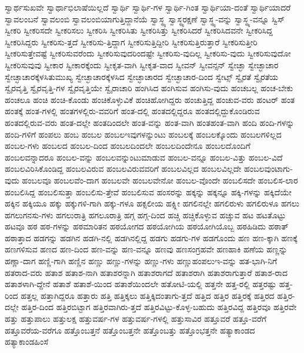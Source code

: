 {ಸ್ವಾರ್ಥಸುಖವೇ
ಸ್ವಾರ್ಥಾಭಿಲಾಷೆಯಿಲ್ಲದೆ
ಸ್ವಾರ್ಥಿ
ಸ್ವಾರ್ಥಿ-ಗಳ
ಸ್ವಾರ್ಥಿ-ಗಿಂತ
ಸ್ವಾರ್ಥಿಯಾ-ದಂತೆ
ಸ್ವಾರ್ಥಿಯಾದರೆ
ಸ್ವಾವಲಂಬನೆ
ಸ್ವಾವಲಂಬಿ
ಸ್ವಾವಲಂಬಿಯಾಗುತ್ತಿದ್ದಾನೆಯೆ
ಸ್ವಾಸ್ಥ್ಯ
ಸ್ವಾಸ್ಥ್ಯರಕ್ಷಣೆ
ಸ್ವಾಸ್ಥ್ಯ-ವನ್ನು
ಸ್ವಾಸ್ಥ್ಯ-ವನ್ನೂ
ಸ್ವಿಸ್
ಸ್ವೀಕರಿ
ಸ್ವೀಕರಿಸದೇ
ಸ್ವೀಕರಿಸಲು
ಸ್ವೀಕರಿಸಿ
ಸ್ವೀಕರಿಸಿತು
ಸ್ವೀಕರಿಸಿತ್ತು
ಸ್ವೀಕರಿಸಿದರೆ
ಸ್ವೀಕರಿಸಿದವನೇ
ಸ್ವೀಕರಿಸಿದ್ದ
ಸ್ವೀಕರಿಸಿದ್ದರು
ಸ್ವೀಕರಿಸು-ತ್ತದೆ
ಸ್ವೀಕರಿಸು-ತ್ತಿದ್ದಾಗ
ಸ್ವೀಕರಿಸುತ್ತಿದ್ದೀರಿ
ಸ್ವೀಕರಿಸುತ್ತಿರುತ್ತಾರೆ
ಸ್ವೀಕರಿಸುತ್ತೀರಿ
ಸ್ವೀಕರಿಸುತ್ತೇವಷ್ಟೆ
ಸ್ವೀಕರಿಸುವರೆಂದು
ಸ್ವೀಕರಿಸುವುದರಿಂದಷ್ಟೇ
ಸ್ವೀಕರಿಸು-ವುದಿಲ್ಲ
ಸ್ವೀಕರಿಸು-ವುದು
ಸ್ವೀಕರಿಸುವುದೋ
ಸ್ವೀಕರಿಸುವುವು
ಸ್ವೀಕಾರ
ಸ್ವೀಕಾರಕ್ಕೆಂದು
ಸ್ವೀಕೃತ-ವಾಗಿ
ಸ್ವೀಕೃತ-ವಾದ
ಸ್ವೀವನ್
ಸ್ವೀವನ್ಸನ್
ಸ್ವೇಚ್ಛಾ
ಸ್ವೇಚ್ಛಾಚಾರ
ಸ್ವೇಚ್ಛಾಚಾರಕ್ಕೆಳಸಿತುಮುಖ್ಯ
ಸ್ವೇಚ್ಛಾಚಾರಕ್ಕೆಳಸಿದ
ಸ್ವೇಚ್ಛಾಚಾರದ
ಸ್ವೇಚ್ಛಾಚಾರ-ದಿಂದ
ಸ್ವೇಟ್ಸ್
ಸ್ವೈರತೆ
ಸ್ವೈರತೆಯ
ಸ್ವೈರವೃತ್ತಿ
ಸ್ವೈರವೃತ್ತಿ-ಗಳ
ಸ್ವೈರವೃತ್ತಿಯೇ
ಸ್ವೈರಾಚಾರಿ
ಹಂಗಿಸಿದ
ಹಂಗಿಸುವ
ಹಂಗಿಸು-ವುದು
ಹಂಚಬಲ್ಲ
ಹಂಚ-ಬೇಕು
ಹಂಚಲೂ
ಹಂಚಿ
ಹಂಚಿ-ಕೊಂಡು
ಹಂಚಿಕೊಳ್ಳುವಿಕೆ
ಹಂಚಿಹೋಗಿದ್ದರು
ಹಂಚುತ್ತಿದ್ದ
ಹಂಚುವ-ವರು
ಹಂಟರ್
ಹಂತ
ಹಂತಕ್ಕೆ
ಹಂತ-ಗಳಲ್ಲಿ
ಹಂತಗಳಲ್ಲಿರು-ವವರಿಗೆ
ಹಂತ-ದಲ್ಲಿ
ಹಂತದಲ್ಲಿದ್ದರೂ
ಹಂತದಲ್ಲಿದ್ದುಕೊಂಡಿರುವ
ಹಂತದಲ್ಲಿರುವ-ವರು
ಹಂತ-ದಲ್ಲೇ
ಹಂತದಿಂದಲೇ
ಹಂತ-ವನ್ನು
ಹಂತ-ವಾಗಿ
ಹಂತಹಂತ-ವಾಗಿ
ಹಂದಿ
ಹಂದಿ-ಗಳನ್ನು
ಹಂದಿ-ಗಳಿಗೆ
ಹಂಪಲು
ಹಂಬ
ಹಂಬಲ
ಹಂಬಲಇವುಗಳನ್ನುಂಟು
ಹಂಬಲಕ್ಕೆ
ಹಂಬಲಕ್ಕೊಂದು
ಹಂಬಲಗಳಿಲ್ಲದ
ಹಂಬಲ-ಗಳು
ಹಂಬಲದ
ಹಂಬಲ-ದಿಂದ
ಹಂಬಲದಿಂದಲೇ
ಹಂಬಲದಿಂದೇನೂ
ಹಂಬಲದೊಂದಿಗೆ
ಹಂಬಲವನ್ನಾದರೂ
ಹಂಬಲ-ವನ್ನು
ಹಂಬಲವನ್ನುಂಟುಮಾಡುವ
ಹಂಬಲ-ವನ್ನೂ
ಹಂಬಲ-ವಿತ್ತು
ಹಂಬಲ-ವಿದೆ
ಹಂಬಲವಿರಿಸಿಕೊಂಡಿದ್ದ
ಹಂಬಲವಿರುವ
ಹಂಬಲವಿರುವವರಿಗೆ
ಹಂಬಲವಿಲ್ಲದ
ಹಂಬಲವಿಲ್ಲದೇ
ಹಂಬಲವುಂಟಾಗು-ವುದು
ಹಂಬಲವೂ
ಹಂಬಲವೆಂ-ದಾಗ
ಹಂಬಲವೇ
ಹಂಬಲವೇನೋ
ಹಂಬಲ-ವೊಂದೇ
ಹಂಬಲಿಸದೇ
ಹಂಬಲಿಸ-ಲಾರ
ಹಂಬಲಿಸಿದ್ದ
ಹಂಬಲಿಸುತ್ತಾ
ಹಂಬಲಿಸು-ತ್ತೇವೆ
ಹಂಬಲಿಸುವ
ಹಂಸರನ್ನು
ಹಕ್ಕನ್ನು
ಹಕ್ಕನ್ನೂ
ಹಕ್ಕಿ-ಗಳನ್ನು
ಹಕ್ಕಿದೆಯೇ
ಹಕ್ಕಿನ
ಹಕ್ಕಿಯೂ
ಹಕ್ಕು
ಹಕ್ಕುಗಳಿ-ಗಾಗಿ
ಹಕ್ಕು-ಗಳೂ
ಹಕ್ಸಲೀಯ
ಹಕ್ಸ್ಲೀ
ಹಗಲಿನಲ್ಲೇ
ಹಗಲಿರುಳು
ಹಗಲಿರುಳೂ
ಹಗಲು
ಹಗಲುಗನಸು-ಗಳು
ಹಗಲುರಾತ್ರಿ
ಹಗಲೂರಾತ್ರಿ
ಹಗ್ಗ
ಹಗ್ಗ-ದಿಂದ
ಹಚ್ಚಿ
ಹಚ್ಚಿಕೊಳ್ಳುವ
ಹಚ್ಚುವ
ಹಟ
ಹಟತೊಟ್ಟು
ಹಟವೂ
ಹಠ
ಹಠ-ಗಳನ್ನು
ಹಠಮಾರಿತನ
ಹಠಯೋಗದ
ಹಠಯೋಗಿಯ
ಹಠಯೋಗಿಯೊಬ್ಬ
ಹಠಹಿಡಿದು
ಹಠಾತ್
ಹಠಾತ್ತಾದ
ಹಡಗನ್ನು
ಹಡಗಿನ
ಹಡಗಿ-ನಲ್ಲಿ
ಹಡಗಿನಲ್ಲಿದ್ದ
ಹಡಗು
ಹಡಗು-ಗಳ
ಹಡಗೊಂದು
ಹಣ
ಹಣ-ಕ್ಕಾಗಿ
ಹಣಕ್ಕೆ
ಹಣಗಳಿಸುವ
ಹಣದ
ಹಣ-ದಿಂದ
ಹಣ-ವನ್ನು
ಹಣ-ವನ್ನೂ
ಹಣವು
ಹಣಸಂಗ್ರಹವೇ
ಹಣಹಾಕಿ
ಹಣೆಯ
ಹಣ್ಣನ್ನು
ಹಣ್ಣಾ-ದಾಗ
ಹಣ್ಣಿ-ಗಾಗಿ
ಹಣ್ಣಿನ
ಹಣ್ಣು
ಹಣ್ಣು-ಗಳನ್ನು
ಹಣ್ಣು-ಗಳು
ಹಣ್ಣುಹಂಪಲುಇ-ವನ್ನು
ಹತ-ಭಾಗಿ-ನಿಗೆ
ಹತರಾದ-ವರು
ಹತಾಶ
ಹತಾಶ-ನಾಗಿ
ಹತಾಶರನ್ನಾಗಿ
ಹತಾಶರಾಗದೆ
ಹತಾಶರಾಗಿ
ಹತಾಶರಾಗುತ್ತಾರೆ
ಹತಾಶ-ರಾದ
ಹತಾಶಳಾಗಿ-ದ್ದೇನೆ
ಹತಾಶೆ
ಹತಾಶೆ-ಯಿಂದ
ಹತಾಶೆಯಿಂದಲೇ
ಹತೋಟಿ-ಯಲ್ಲಿ
ಹತ್ತನೇ
ಹತ್ತ-ರಲ್ಲಿ
ಹತ್ತರಷ್ಟು
ಹತ್ತ-ರಿಂದ
ಹತ್ತಲ್ಲ
ಹತ್ತಾಗಿದ್ದರೂ
ಹತ್ತಾರು
ಹತ್ತಿ
ಹತ್ತಿಕ್ಕಲು
ಹತ್ತಿಕ್ಕಿದಂತಾಗು-ತ್ತದೆ
ಹತ್ತಿದ
ಹತ್ತಿರ
ಹತ್ತಿರಕ್ಕೆ
ಹತ್ತಿರದ
ಹತ್ತಿರ-ದಲ್ಲೇ
ಹತ್ತಿರ-ದಿಂದ
ಹತ್ತಿರಬಿಟ್ಟಾಗ
ಹತ್ತಿರವಾಗಿರು-ತ್ತದೆ
ಹತ್ತಿರವಿಟ್ಟು-ಕೊಳ್ಳ-ಬಹುದು
ಹತ್ತಿರವಿದ್ದ
ಹತ್ತಿರವೂ
ಹತ್ತಿರವೇ
ಹತ್ತು
ಹತ್ತುಪಾಲು
ಹತ್ತುಲಕ್ಷ
ಹತ್ತುವರ್ಷ-ಗಳ
ಹತ್ತುವರ್ಷ-ಗಳಲ್ಲಿ
ಹತ್ತುಸಾವಿರ
ಹತ್ತೂವರೆ
ಹತ್ತೂ-ವರೆಗೆ
ಹತ್ತೂವರೆಯ-ವರೆಗೂ
ಹತ್ತೊಂಬತ್ತನೆ
ಹತ್ತೊಂಬತ್ತನೇ
ಹತ್ತೊಂಬತ್ತು
ಹತ್ತೊಂಭತ್ತನೇ
ಹತ್ಯಾಕಾಂಡದ
ಹತ್ಯಾಕಾಂಡಹಿಂಸೆ
}
